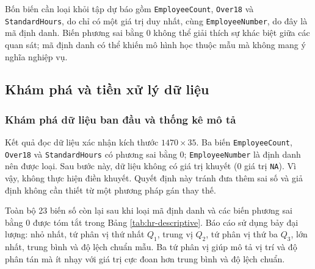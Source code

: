 Bốn biến cần loại khỏi tập dự báo gồm \texttt{EmployeeCount},
\texttt{Over18} và \texttt{StandardHours}, do chỉ có một giá trị duy
nhất, cùng \texttt{EmployeeNumber}, do đây là mã định danh. Biến phương
sai bằng 0 không thể giải thích sự khác biệt giữa các quan sát; mã định
danh có thể khiến mô hình học thuộc mẫu mà không mang ý nghĩa nghiệp vụ.

\subsection{Khám phá và tiền xử lý dữ liệu}

\subsubsection{Khám phá dữ liệu ban đầu và thống kê mô tả}

Kết quả đọc dữ liệu xác nhận kích thước \(1470\times35\). Ba biến
\texttt{EmployeeCount}, \texttt{Over18} và \texttt{StandardHours} có
phương sai bằng 0; \texttt{EmployeeNumber} là định danh nên được loại.
Sau bước này, dữ liệu không có giá trị khuyết (0 giá trị
\texttt{NA}). Vì vậy, không thực hiện điền khuyết. Quyết định này tránh
đưa thêm sai số và giả định không cần thiết từ một phương pháp gán thay
thế.

Toàn bộ 23 biến số còn lại sau khi loại mã định danh và các biến phương
sai bằng 0 được tóm tắt trong Bảng \ref{tab:hr-descriptive}. Báo cáo sử
dụng bảy đại lượng: nhỏ nhất, tứ phân vị thứ nhất \(Q_1\), trung vị
\(Q_2\), tứ phân vị thứ ba \(Q_3\), lớn nhất, trung bình và độ lệch
chuẩn mẫu. Ba tứ phân vị giúp mô tả vị trí và độ phân tán mà ít nhạy với
giá trị cực đoan hơn trung bình và độ lệch chuẩn.

